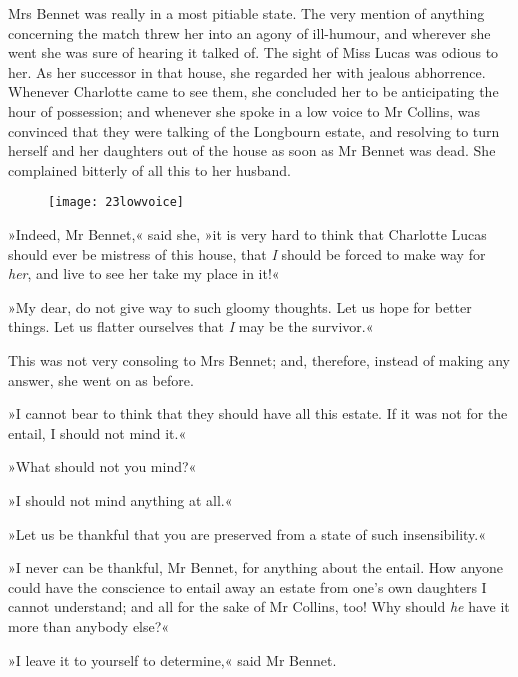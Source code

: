 Mrs Bennet was really in a most pitiable state. The very mention of anything concerning the match threw her into an agony of ill-humour, and wherever she went she was sure of hearing it talked of. The sight of Miss Lucas was odious to her. As her successor in that house, she regarded her with jealous abhorrence. Whenever Charlotte came to see them, she concluded her to be anticipating the hour of possession; and whenever she spoke in a low voice to Mr Collins, was convinced that they were talking of the Longbourn estate, and resolving to turn herself and her daughters out of the house as soon as Mr Bennet was dead. She complained bitterly of all this to her husband.

\begin{figure}[tbph]
\centering
\texttt{[image: 23lowvoice]}
\end{figure}

»Indeed, Mr Bennet,« said she, »it is very hard to think that Charlotte Lucas should ever be mistress of this house, that \textit{I} should be forced to make way for \textit{her}, and live to see her take my place in it!«

»My dear, do not give way to such gloomy thoughts. Let us hope for better things. Let us flatter ourselves that \textit{I} may be the survivor.«

This was not very consoling to Mrs Bennet; and, therefore, instead of making any answer, she went on as before.

»I cannot bear to think that they should have all this estate. If it was not for the entail, I should not mind it.«

»What should not you mind?«

»I should not mind anything at all.«

»Let us be thankful that you are preserved from a state of such insensibility.«

»I never can be thankful, Mr Bennet, for anything about the entail. How anyone could have the conscience to entail away an estate from one's own daughters I cannot understand; and all for the sake of Mr Collins, too! Why should \textit{he} have it more than anybody else?«

»I leave it to yourself to determine,« said Mr Bennet.
